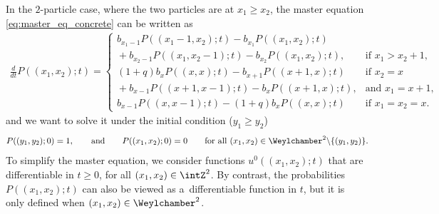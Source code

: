 In the $2$-particle case, where the two particles are at $x_1 \geq x_2$, the master equation \eqref{eq:master_eq_concrete} can be written as
\begin{gather} \label{eq:master_eq_2_particles}
 \frac{d}{dt} P((x_1, x_2); t) =
 \begin{cases}
 b_{x_1 - 1} P((x_1 - 1, x_2); t) - b_{x_1} P((x_1, x_2); t) & \\
{} + b_{x_2 - 1} P((x_1, x_2 - 1); t) - b_{x_2} P((x_1, x_2); t),
 & \text{if $x_1 > x_2 + 1$}, \\
 (1 + q) b_xP((x, x); t) - b_{x + 1} P((x + 1, x); t) & \text{if $x_2 = x$} \\
{} + b_{x - 1} P((x + 1, x - 1); t) - b_x P((x + 1, x); t),
& \text{and $x_1 = x + 1$}, \\
 b_{x - 1} P((x, x - 1); t) - (1 + q) b_x P((x, x); t) & \text{if $x_1 = x_2 = x$}.
 \end{cases}\!\!\!\!
\end{gather}
and we want to solve it under the initial condition ($y_1 \geq y_2$)
\begin{gather} \label{eq:init_C_2_particles}
 P((y_1, y_2); 0) = 1, \qquad \text{and} \qquad P((x_1, x_2); 0) = 0 \qquad \text{for all $(x_1, x_2) \in \Weylchamber^2 {\setminus} \{ (y_1, y_2) \}$}.\!\!\!
\end{gather}
To simplify the master equation, we consider functions $u^0((x_1, x_2); t)$ that are dif\/ferentiable in $t \geq 0$, for all $(x_1, x_2) \in \intZ^2$. By contrast, the probabilities $P((x_1, x_2); t)$ can also be viewed as a~dif\/ferentiable function in $t$, but it is only def\/ined when $(x_1, x_2) \in \Weylchamber^2$.


